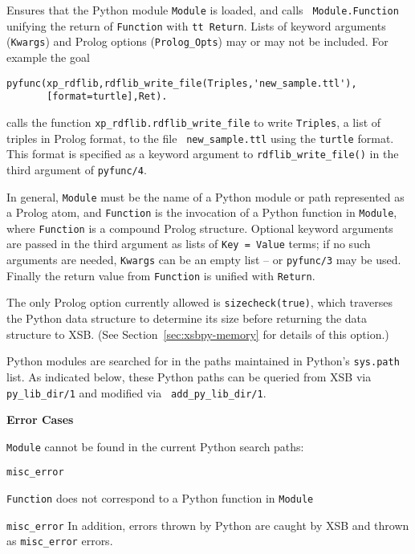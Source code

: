 \begin{description}

%
 Ensures that the Python module {\tt Module} is loaded, and calls {\tt
   Module.Function} unifying the return of {\tt Function} with {\tt tt
   Return}.  Lists of keyword arguments ({\tt Kwargs}) and Prolog
 options ({\tt Prolog\_Opts}) may or may not be included.  For example
 the goal

\begin{verbatim}
pyfunc(xp_rdflib,rdflib_write_file(Triples,'new_sample.ttl'),
       [format=turtle],Ret).
\end{verbatim}

calls the function {\tt xp\_rdflib.rdflib\_write\_file} to write
{\tt Triples}, a list of triples in Prolog format, to the file {\tt
  new\_sample.ttl} using the {\tt turtle} format.  This format is
specified as a keyword argument to {\tt rdflib\_write\_file()} in the
third argument of {\tt pyfunc/4}.

In general, {\tt Module} must be the name of a Python module or path
represented as a Prolog atom, and {\tt Function} is the invocation of
a Python function in {\tt Module}, where {\tt Function} is a compound
Prolog structure.  Optional keyword arguments are passed in the third
argument as lists of {\tt Key = Value} terms; if no such arguments are
needed, {\tt Kwargs} can be an empty list -- or {\tt pyfunc/3} may be
used.  Finally the return value from {\tt Function} is unified with
{\tt Return}.

The only Prolog option currently allowed is {\tt sizecheck(true)},
which traverses the Python data structure to determine its size before
returning the data structure to XSB.  (See
Section~\ref{sec:xsbpy-memory} for details of this option.)

Python modules are searched for in the paths maintained in Python's
{\tt sys.path} list.  As indicated below, these Python paths can be
queried from XSB via {\tt py\_lib\_dir/1} and modified via {\tt
  add\_py\_lib\_dir/1}.
     
{\bf Error Cases}
\bi
\item {\tt Module} cannot be found in the current Python search paths:
\bi
\item {\tt misc\_error}
\ei
\item {\tt Function} does not correspond to a Python function in {\tt Module}
\bi
\item {\tt misc\_error}
  \ei \ei
%
  In addition, errors thrown by Python are
  caught by XSB and thrown as {\tt misc\_error} errors.


\end{description}
